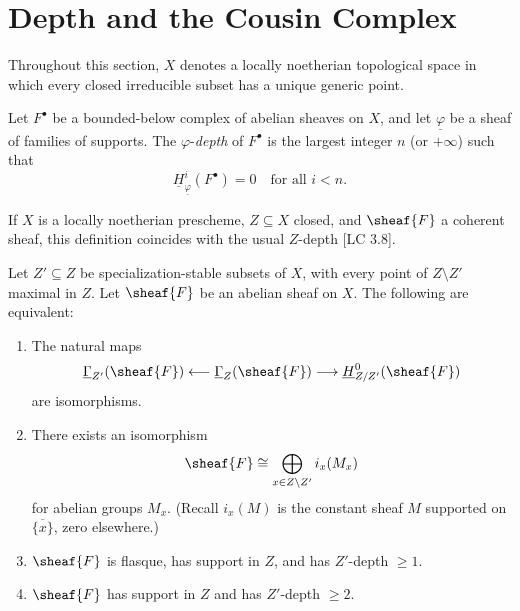 
\setcounter{page}{229}
\section{Depth and the Cousin Complex}

Throughout this section, \(X\) denotes a locally noetherian topological space in which every closed irreducible subset has a unique generic point.

\begin{definition}
Let \(F^\bullet\) be a bounded-below complex of abelian sheaves on \(X\), and let \(\underline{\varphi}\) be a sheaf of families of supports. The \(\varphi\)-\textit{depth} of \(F^\bullet\) is the largest integer \(n\) (or \(+\infty\)) such that
\[
\underline{H}_{\underline{\varphi}}^i(F^\bullet) = 0 \quad \text{for all } i < n.
\]
\end{definition}

\begin{remark}
If \(X\) is a locally noetherian prescheme, \(Z\subseteq X\) closed, and \(\sheaf{F}\) a coherent sheaf, this definition coincides with the usual \(Z\)-depth [LC 3.8].
\end{remark}

\setcounter{page}{230}
\begin{proposition}
Let \(Z'\subseteq Z\) be specialization-stable subsets of \(X\), with every point of \(Z\setminus Z'\) maximal in \(Z\). Let \(\sheaf{F}\) be an abelian sheaf on \(X\). The following are equivalent:
\begin{enumerate}
\item[\textup{(i)}] The natural maps
\[
\underline{\Gamma}_{Z'}(\sheaf{F}) \longleftarrow \underline{\Gamma}_Z(\sheaf{F}) \longrightarrow \underline{H}_{Z/Z'}^0(\sheaf{F})
\]
are isomorphisms.

\item[\textup{(ii)}] There exists an isomorphism
\[
\sheaf{F} \cong \bigoplus_{x\in Z\setminus Z'} i_x(M_x)
\]
for abelian groups \(M_x\).
(Recall \(i_x(M)\) is the constant sheaf \(M\) supported on \(\overline{\{x\}}\), zero elsewhere.)

\item[\textup{(iii)}] \(\sheaf{F}\) is flasque, has support in \(Z\), and has \(Z'\)-depth \(\ge 1\).

\item[\textup{(iv)}] \(\sheaf{F}\) has support in \(Z\) and has \(Z'\)-depth \(\ge 2\).
\end{enumerate}
\end{proposition}

